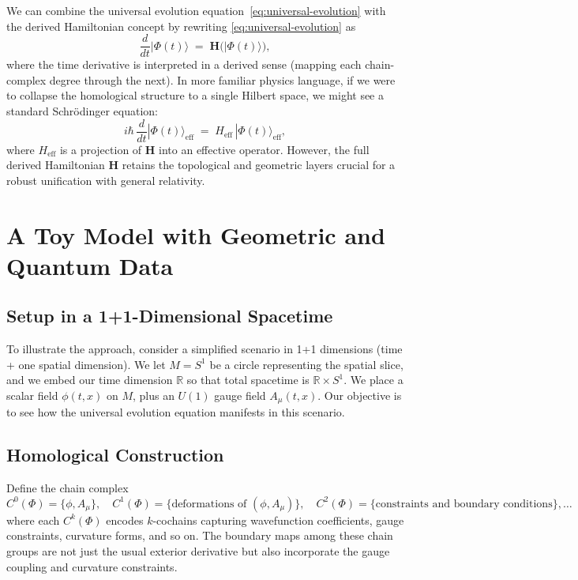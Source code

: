 \documentclass[11pt]{article}
\begin{document}
We can combine the universal evolution equation~\eqref{eq:universal-evolution} with the derived Hamiltonian concept by rewriting \eqref{eq:universal-evolution} as
\begin{equation}
\frac{d}{dt}|\Phi(t)\rangle \;=\; \mathbf{H}\bigl(|\Phi(t)\rangle\bigr),
\end{equation}
where the time derivative is interpreted in a derived sense (mapping each chain-complex degree through the next). In more familiar physics language, if we were to collapse the homological structure to a single Hilbert space, we might see a standard Schr\"odinger equation:
\[
i \hbar\,\frac{d}{dt}|\Phi(t)\rangle_{\mathrm{eff}} \;=\; H_{\mathrm{eff}}\,|\Phi(t)\rangle_{\mathrm{eff}},
\]
where $H_{\mathrm{eff}}$ is a projection of $\mathbf{H}$ into an effective operator. However, the full derived Hamiltonian $\mathbf{H}$ retains the topological and geometric layers crucial for a robust unification with general relativity. 

\section{A Toy Model with Geometric and Quantum Data}
\label{sec:toy-model}

\subsection{Setup in a 1+1-Dimensional Spacetime}

To illustrate the approach, consider a simplified scenario in 1+1 dimensions (time + one spatial dimension). We let $M = S^1$ be a circle representing the spatial slice, and we embed our time dimension $\mathbb{R}$ so that total spacetime is $\mathbb{R} \times S^1$. We place a scalar field $\phi(t,x)$ on $M$, plus an $U(1)$ gauge field $A_\mu(t,x)$. Our objective is to see how the universal evolution equation manifests in this scenario.

\subsection{Homological Construction}

Define the chain complex
\[
C^0(\Phi) = \{\phi, A_\mu\}, \quad
C^1(\Phi) = \{\text{deformations of }(\phi, A_\mu)\}, \quad
C^2(\Phi) = \{\text{constraints and boundary conditions}\}, \dots
\]
where each $C^k(\Phi)$ encodes $k$-cochains capturing wavefunction coefficients, gauge constraints, curvature forms, and so on. The boundary maps among these chain groups are not just the usual exterior derivative but also incorporate the gauge coupling and curvature constraints.
\end{document}
